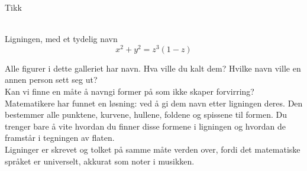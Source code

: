 \documentclass[no]{./../../common/SurferDesc}%
\begin{document}
\footnotesize

 

\begin{surferPage}
  \begin{surferTitle}Tikk\end{surferTitle}  \\
Ligningen, med et tydelig navn \\
\smallskip
\[x^2 + y^2	= z^3	(1 - z) \]


\singlespacing
Alle figurer i dette galleriet har navn. Hva ville du kalt dem? Hvilke navn ville en annen person sett seg ut?\\
\vspace{0.3cm}
Kan vi finne en måte å navngi former på som ikke skaper forvirring? Matematikere har funnet en løsning: ved å gi dem navn etter ligningen deres. Den bestemmer alle punktene, kurvene, hullene, foldene og spissene til formen. Du trenger bare å vite hvordan du finner disse formene i ligningen og hvordan de framstår i tegningen av flaten.\\
\vspace{0.3cm}
Ligninger er skrevet og tolket på samme måte verden over, fordi det matematiske språket er universelt, akkurat som noter i musikken. 

  \begin{surferText}
     \end{surferText}
\end{surferPage}
\end{document}
